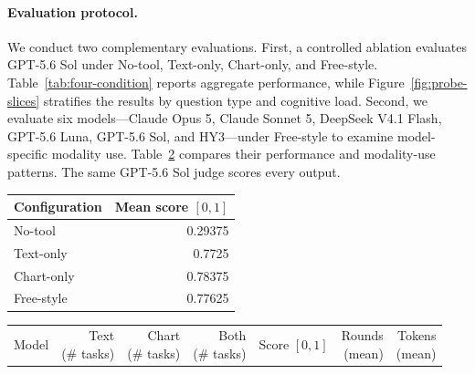 \documentclass{article}
\begin{document}
\paragraph{Evaluation protocol.}
We conduct two complementary evaluations.
First, a controlled ablation evaluates GPT-5.6 Sol under No-tool, Text-only, Chart-only, and Free-style.
Table~\ref{tab:four-condition} reports aggregate performance, while Figure~\ref{fig:probe-slices} stratifies the results by question type and cognitive load.
Second, we evaluate six models---Claude Opus 5, Claude Sonnet 5, DeepSeek V4.1 Flash, GPT-5.6 Luna, GPT-5.6 Sol, and HY3---under Free-style to examine model-specific modality use.
Table~\ref{tab:model-bias} compares their performance and modality-use patterns.
The same GPT-5.6 Sol judge scores every output.


\begin{table}[t]
	\centering
	\hfill
	\begin{minipage}[t]{0.32\textwidth}
		\centering
		\small
		\label{tab:four-condition}
		\vspace{0.35em}
		\begin{tabular}{@{}lr@{}}
			\toprule
			Configuration & Mean score $[0,1]$ \\
			\midrule
			No-tool & 0.29375 \\
			Text-only & 0.7725 \\
			Chart-only & 0.78375 \\
			Free-style & 0.77625 \\
			\bottomrule
		\end{tabular}
	\end{minipage}\hfill
	\begin{minipage}[t]{0.62\textwidth}
		\centering
		\label{tab:model-bias}
		\vspace{0.35em}
		{\setlength{\tabcolsep}{3pt}\scriptsize
			\begin{tabular}{@{}lrrrrrr@{}}
				\toprule
				Model &
				\makecell{Text\\(\# tasks)} &
				\makecell{Chart\\(\# tasks)} &
				\makecell{Both\\(\# tasks)} &
				\makecell{Score\\$[0,1]$} &
				\makecell{Rounds\\(mean)} &
				\makecell{Tokens\\(mean)} \\

\end{tabular}}
\end{minipage}
\end{table}
\end{document}
